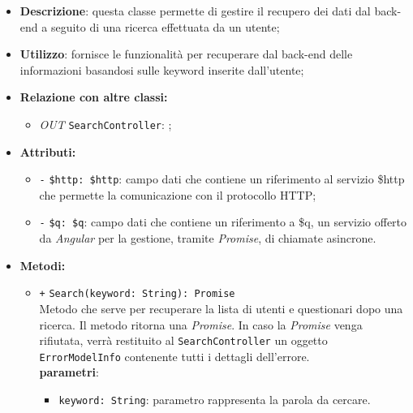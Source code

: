 \begin{itemize}
	\item \textbf{Descrizione}: questa classe permette di gestire il recupero dei dati dal back-end a seguito di una ricerca effettuata da un utente;
	\item \textbf{Utilizzo}: fornisce le funzionalità per recuperare dal back-end delle informazioni basandosi sulle keyword inserite dall'utente;
	\item \textbf{Relazione con altre classi:}
	\begin{itemize}
		\item \textit{OUT} \texttt{SearchController}: ;
	\end{itemize}
	\item \textbf{Attributi:}
	\begin{itemize}
		\item \texttt{-} \texttt{\$http: \$http}: campo dati che contiene un riferimento al servizio \$http che permette la comunicazione con il protocollo HTTP;
		\item \texttt{-} \texttt{\$q: \$q}: campo dati che contiene un riferimento a \$q, un servizio offerto da \textit{Angular} per la gestione, tramite \textit{Promise}, di chiamate asincrone. 
	\end{itemize}
	\item \textbf{Metodi:}
	\begin{itemize}
		\item \texttt{+} \texttt{Search(keyword: String): Promise} \\Metodo che serve per recuperare la lista di utenti e questionari dopo una ricerca. Il metodo ritorna una \textit{Promise}. In caso la \textit{Promise} venga rifiutata, verrà restituito al \texttt{SearchController} un oggetto \texttt{ErrorModelInfo} contenente tutti i dettagli dell'errore. \\
		\textbf{parametri}:
		\begin{itemize}
			\item \texttt{keyword: String}: parametro rappresenta la parola da cercare.
		\end{itemize}
	\end{itemize}
\end{itemize}

